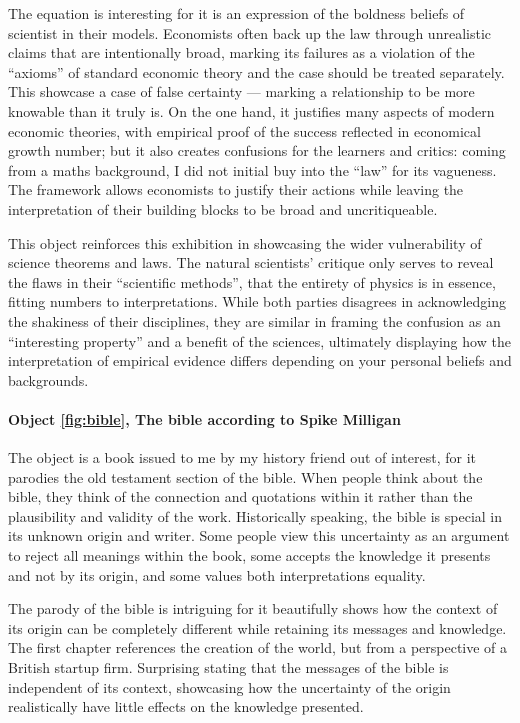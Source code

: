 \documentclass[a4paper,12pt]{article}
\begin{document}
The equation is interesting for it is an expression of the boldness beliefs of scientist in their models. Economists often back up the law through unrealistic claims that are intentionally broad, marking its failures as a violation of the ``axioms'' of standard economic theory and the case should be treated separately. This showcase a case of false certainty --- marking a relationship to be more knowable than it truly is. On the one hand, it justifies many aspects of modern economic theories, with empirical proof of the success reflected in economical growth number; but it also creates confusions for the learners and critics: coming from a maths background, I did not initial buy into the ``law'' for its vagueness. The framework allows economists to justify their actions while leaving the interpretation of their building blocks to be broad and uncritiqueable.

This object reinforces this exhibition in showcasing the wider vulnerability of science theorems and laws. The natural scientists' critique only serves to reveal the flaws in their ``scientific methods'', that the entirety of physics is in essence, fitting numbers to interpretations. While both parties disagrees in acknowledging the shakiness of their disciplines, they are similar in framing the confusion as an ``interesting property'' and a benefit of the sciences, ultimately displaying how the interpretation of empirical evidence differs depending on your personal beliefs and backgrounds.

\paragraph{Object \ref{fig:bible}, The bible according to Spike Milligan}
The object is a book issued to me by my history friend out of interest, for it parodies the old testament section of the bible. When people think about the bible, they think of the connection and quotations within it rather than the plausibility and validity of the work. Historically speaking, the bible is special in its unknown origin and writer. Some people view this uncertainty as an argument to reject all meanings within the book, some accepts the knowledge it presents and not by its origin, and some values both interpretations equality.


The parody of the bible is intriguing for it beautifully shows how the context of its origin can be completely different while retaining its messages and knowledge. The first chapter references the creation of the world, but from a perspective of a British startup firm. Surprising stating that the messages of the bible is independent of its context, showcasing how the uncertainty of the origin realistically have little effects on the knowledge presented.
\end{document}
